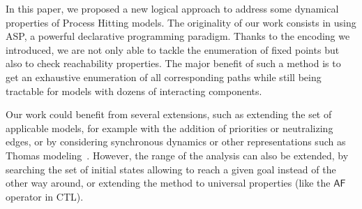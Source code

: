 In this paper, we proposed a new logical approach to address some dynamical properties of Process Hitting models.
The originality of our work consists in using ASP, a powerful declarative programming paradigm.
Thanks to the encoding we introduced, we are not only able to tackle the enumeration of fixed points but also to check reachability properties.
The major benefit of such a method is to get an exhaustive enumeration of all corresponding paths while still being tractable for models with dozens of interacting components.



Our work could benefit from several extensions, such as extending the set of applicable models,
for example with the addition
of priorities or neutralizing edges,
or by considering synchronous dynamics or other representations
such as Thomas modeling~\cite{Thomas73}.
However, the range of the analysis can also be extended,
by searching the set of initial states
allowing to reach a given goal instead of the other way around,
or extending the method to universal properties (like the $\mathsf{AF}$ operator in CTL).
